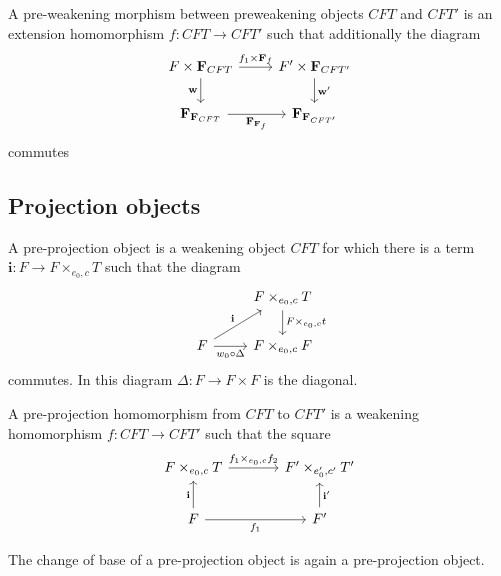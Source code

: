 \begin{defn}
A pre-weakening morphism between preweakening objects $CFT$ and $CFT'$ is an
extension homomorphism $f:CFT\to CFT'$ such that additionally the diagram
\begin{equation*}
\begin{tikzcd}
F\times \mathbf{F}_{CFT}
  \ar{d}[swap]{\mathbf{w}}
  \ar{r}{f_1\times\mathbf{F}_f}
  &
F'\times\mathbf{F}_{CFT'}
  \ar{d}{\mathbf{w'}}
  \\
\mathbf{F}_{\mathbf{F}_{CFT}}
  \ar{r}[swap]{\mathbf{F}_{\mathbf{F}_f}}
  &
\mathbf{F}_{\mathbf{F}_{CFT'}}
\end{tikzcd}
\end{equation*}
commutes
\end{defn}

\subsection{Projection objects}
\begin{defn}
A pre-projection object is a weakening object $CFT$ for which there is a term
$\mathbf{i}:F\to F\times_{e_0,c}T$ such that the diagram
\begin{equation*}
\begin{tikzcd}
{} & F\times_{e_0,c}T \ar{d}{F\times_{e_0,c}t}\\
F \ar{ur}{\mathbf{i}} \ar{r}[swap]{w_0\circ\Delta} & F\times_{e_0,c}F
\end{tikzcd}
\end{equation*}
commutes. In this diagram $\Delta:F\to F\times F$ is the diagonal.
\end{defn}

\begin{defn}
A pre-projection homomorphism from $CFT$ to $CFT'$ is a weakening homomorphism
$f:CFT\to CFT'$ such that the square
\begin{equation*}
\begin{tikzcd}[column sep=large]
F\times_{e_0,c}T
  \ar{r}{f_1\times_{e_0,c}f_2}
  &
F'\times_{e_0',c'}T'
  \\
F \ar{r}[swap]{f_1}
  \ar{u}{\mathbf{i}}
  &
F'
  \ar{u}[swap]{\mathbf{i}'}
\end{tikzcd}
\end{equation*}
\end{defn}

\begin{lem}
The change of base of a pre-projection object is again a pre-projection object.
\end{lem}

